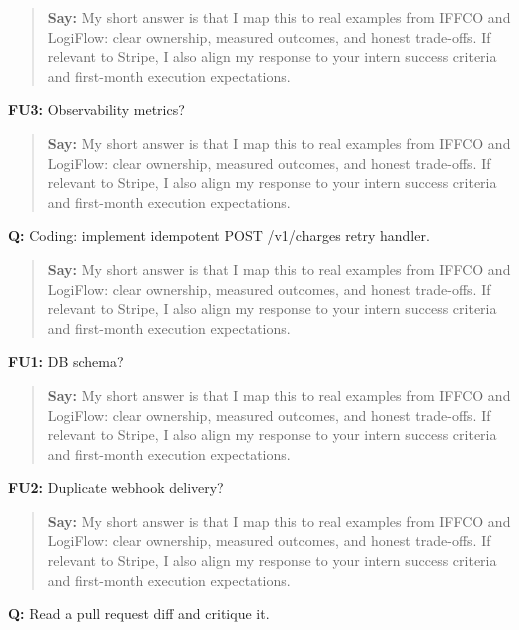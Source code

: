 \documentclass[9pt,a4paper]{article}
\begin{document}
\begin{quote}\small\textbf{Say:} My short answer is that I map this to real examples from IFFCO and LogiFlow: clear ownership, measured outcomes, and honest trade-offs. If relevant to Stripe, I also align my response to your intern success criteria and first-month execution expectations.\end{quote}
\vspace{2mm}
\textbf{FU3:} Observability metrics?

\begin{quote}\small\textbf{Say:} My short answer is that I map this to real examples from IFFCO and LogiFlow: clear ownership, measured outcomes, and honest trade-offs. If relevant to Stripe, I also align my response to your intern success criteria and first-month execution expectations.\end{quote}
\vspace{2mm}
\textbf{Q:} Coding: implement idempotent POST /v1/charges retry handler.

\begin{quote}\small\textbf{Say:} My short answer is that I map this to real examples from IFFCO and LogiFlow: clear ownership, measured outcomes, and honest trade-offs. If relevant to Stripe, I also align my response to your intern success criteria and first-month execution expectations.\end{quote}
\vspace{2mm}
\textbf{FU1:} DB schema?

\begin{quote}\small\textbf{Say:} My short answer is that I map this to real examples from IFFCO and LogiFlow: clear ownership, measured outcomes, and honest trade-offs. If relevant to Stripe, I also align my response to your intern success criteria and first-month execution expectations.\end{quote}
\vspace{2mm}
\textbf{FU2:} Duplicate webhook delivery?

\begin{quote}\small\textbf{Say:} My short answer is that I map this to real examples from IFFCO and LogiFlow: clear ownership, measured outcomes, and honest trade-offs. If relevant to Stripe, I also align my response to your intern success criteria and first-month execution expectations.\end{quote}
\vspace{2mm}
\textbf{Q:} Read a pull request diff and critique it.
\end{document}
